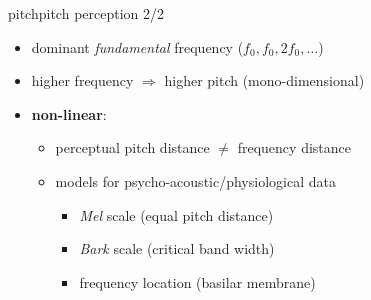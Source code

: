 	\begin{frame}{pitch}{pitch perception 2/2}
		\begin{itemize}
			\item	dominant \textit{fundamental} frequency ($f_0,f_0,2f_0,\ldots$)

			
			\item<2->	higher frequency $\Rightarrow$ higher pitch (mono-dimensional)

			\item<3->	\textbf{non-linear}:
				\begin{itemize}
					\item	perceptual pitch distance $\neq$ frequency distance
                    
					\item<4->	models for psycho-acoustic/physiological data
						\begin{itemize}
							\item	\textit{Mel} scale (equal pitch distance)

							\item<5->	\textit{Bark} scale (critical band width)

							\item<6->	frequency location (basilar membrane)
						\end{itemize}
				\end{itemize}
		\end{itemize}
	\end{frame}
